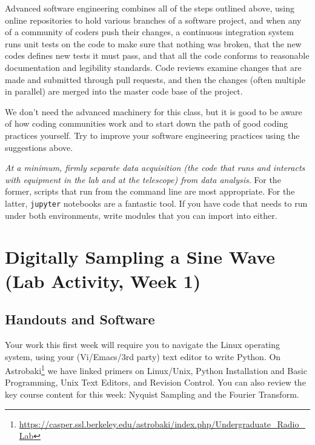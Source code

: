 \documentclass[12pt,preprint]{aastex}
\begin{document}
\noindent
Advanced software engineering combines all of the steps outlined above, using online repositories to hold various
branches of a software project, and when any of a community of coders push their changes, a continuous integration system runs
unit tests on the code to make sure that nothing was broken, that the new codes defines new tests it must pass, and that
all the code conforms to reasonable documentation and legibility standards.  Code reviews examine changes that are
made and submitted through pull requests, and then the changes (often multiple in parallel) are merged into the master code base of the
project.

We don't need the advanced machinery for this class, but it is good to be aware of how coding communities work and
to start down the path of good coding practices yourself. Try to improve your software engineering practices using the
suggestions above.

{\it At a minimum, firmly separate data acquisition (the code that runs and interacts with
equipment in the lab and at the telescope) from data analysis}.  For the former, scripts that run from the command line
are most appropriate. For the latter, {\tt jupyter} notebooks are a fantastic tool. If you have code that needs to
run under both environments, write modules that you can import into either.


\section{Digitally Sampling a Sine Wave (Lab Activity, Week 1)}
\label{nyquist}

\subsection{Handouts and Software}

\noindent
Your work this first week will require you to navigate
the Linux operating system, using your (Vi/Emacs/3rd party) text editor to write Python. 
On Astrobaki\footnote{\url{https://casper.ssl.berkeley.edu/astrobaki/index.php/Undergraduate\_Radio\_Lab}}
we have linked primers on
Linux/Unix, Python Installation and Basic Programming, Unix Text Editors, and Revision Control.  You can
also review the key course content for this week: Nyquist Sampling and the Fourier Transform.
\end{document}
